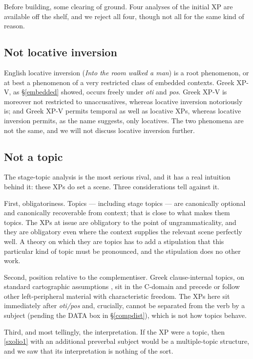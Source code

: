 \documentclass[11pt]{article}
\begin{document}
Before building, some clearing of ground.  Four analyses of the initial XP are available off the shelf, and we reject all four, though not all for the same kind of reason.

\subsection{Not locative inversion}

English locative inversion (\emph{Into the room walked a man}) is a root phenomenon, or at best a phenomenon of a very restricted class of embedded contexts.  Greek XP-V, as \S\ref{embedded} showed, occurs freely under \emph{oti} and \emph{pos}.  Greek XP-V is moreover not restricted to unaccusatives, whereas locative inversion notoriously is; and Greek XP-V permits temporal as well as locative XPs, whereas locative inversion permits, as the name suggests, only locatives.  The two phenomena are not the same, and we will not discuss locative inversion further.

\subsection{Not a topic}\label{nottopic}

The stage-topic analysis is the most serious rival, and it has a real intuition behind it: these XPs do set a scene.  Three considerations tell against it.

First, obligatoriness.  Topics --- including stage topics --- are canonically optional and canonically recoverable from context; that is close to what makes them topics.  The XPs at issue are obligatory to the point of ungrammaticality, and they are obligatory even where the context supplies the relevant scene perfectly well.  A theory on which they are topics has to add a stipulation that this particular kind of topic must be pronounced, and the stipulation does no other work.

Second, position relative to the complementiser.  Greek clause-internal topics, on standard cartographic assumptions \citep{rizzi:97}, sit in the C-domain and precede or follow other left-peripheral material with characteristic freedom.  The XPs here sit immediately after \emph{oti/pos} and, crucially, cannot be separated from the verb by a subject (pending the DATA box in \S\ref{compdist}), which is not how topics behave.

Third, and most tellingly, the interpretation.  If the XP were a topic, then \ref{sxolio1} with an additional preverbal subject would be a multiple-topic structure, and we saw that its interpretation is nothing of the sort.
\end{document}
